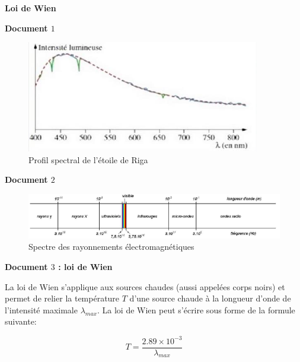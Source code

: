 \exo \textbf{Loi de Wien}

\vspace{0.3cm}

\textbf{Document $1$}

\begin{figure}[h]
\begin{center}
\includegraphics[width=0.5\columnwidth]{images/Exo1_Profil_Spectral_Etoile_Riga}
\end{center}
\caption{\label{fig:Profil_Spectral_Etoile_Riga}
Profil spectral de l'étoile de Riga}\end{figure}

\vspace{0.3cm}

\textbf{Document $2$}

\begin{figure}[h]
\begin{center}
\includegraphics[width=\columnwidth]{images/Exo1_Spectre_Rayonnements_EM}
\end{center}
\caption{\label{fig:Spectre_Rayonnements_EM}
Spectre des rayonnements électromagnétiques}\end{figure}

\vspace{0.3cm}

\textbf{Document $3$ : loi de Wien}

\vspace{0.3cm}

La loi de Wien s'applique aux sources chaudes (aussi appelées corps noirs) et permet de relier la température $T$ d'une source chaude à la longueur d'onde de l'intensité maximale $\lambda_{max}$. La loi de Wien peut s'écrire sous forme de la formule suivante:

$$T = \frac{2.89 \times 10^{-3}}{\lambda_{max}}$$

